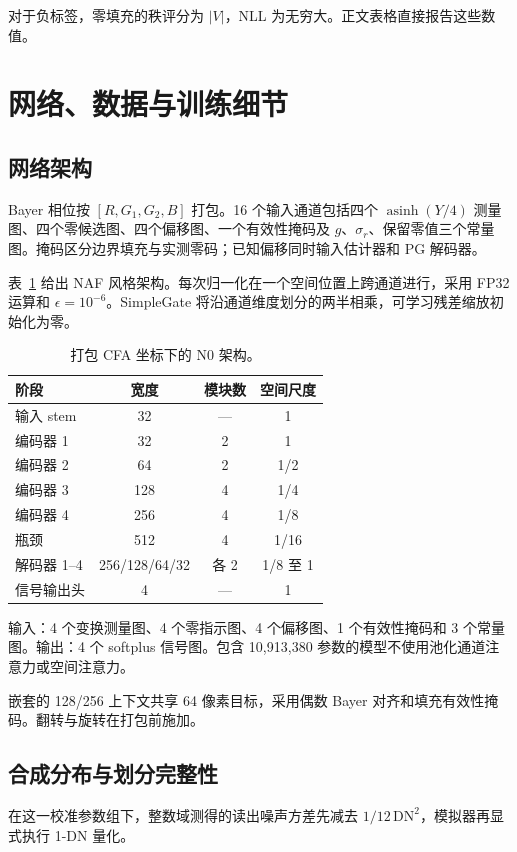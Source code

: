 \documentclass[10pt,twocolumn,journal]{IEEEtran}
\begin{document}
对于负标签，零填充的秩评分为 $|V|$，NLL 为无穷大。正文表格直接报告这些数值。

\section{网络、数据与训练细节}
\subsection{网络架构}
Bayer 相位按 $[R,G_1,G_2,B]$ 打包。16 个输入通道包括四个 $\operatorname{asinh}(Y/4)$ 测量图、四个零候选图、四个偏移图、一个有效性掩码及 $g$、$\sigma_r$、保留零值三个常量图。掩码区分边界填充与实测零码；已知偏移同时输入估计器和 PG 解码器。

表~\ref{tab:architecture} 给出 NAF 风格架构。每次归一化在一个空间位置上跨通道进行，采用 FP32 运算和 $\epsilon=10^{-6}$。SimpleGate 将沿通道维度划分的两半相乘，可学习残差缩放初始化为零。

\begin{table}[t]
\centering\footnotesize
\caption{打包 CFA 坐标下的 N0 架构。}
\label{tab:architecture}
\setlength{\tabcolsep}{3pt}
\begin{tabular}{@{}lccc@{}}
\toprule
阶段 & 宽度 & 模块数 & 空间尺度\\
\midrule
输入 stem & 32 & --- & 1\\
编码器 1 & 32 & 2 & 1\\
编码器 2 & 64 & 2 & 1/2\\
编码器 3 & 128 & 4 & 1/4\\
编码器 4 & 256 & 4 & 1/8\\
瓶颈 & 512 & 4 & 1/16\\
解码器 1--4 & 256/128/64/32 & 各 2 & 1/8 至 1\\
信号输出头 & 4 & --- & 1\\
\bottomrule
\end{tabular}

\vspace{3pt}
\footnotesize 输入：4 个变换测量图、4 个零指示图、4 个偏移图、1 个有效性掩码和 3 个常量图。输出：4 个 softplus 信号图。包含 10,913,380 参数的模型不使用池化通道注意力或空间注意力。
\end{table}

嵌套的 128/256 上下文共享 64 像素目标，采用偶数 Bayer 对齐和填充有效性掩码。翻转与旋转在打包前施加。

\subsection{合成分布与划分完整性}
在这一校准参数组下，整数域测得的读出噪声方差先减去 $1/12\,\mathrm{DN}^2$，模拟器再显式执行 1-DN 量化。
\end{document}
